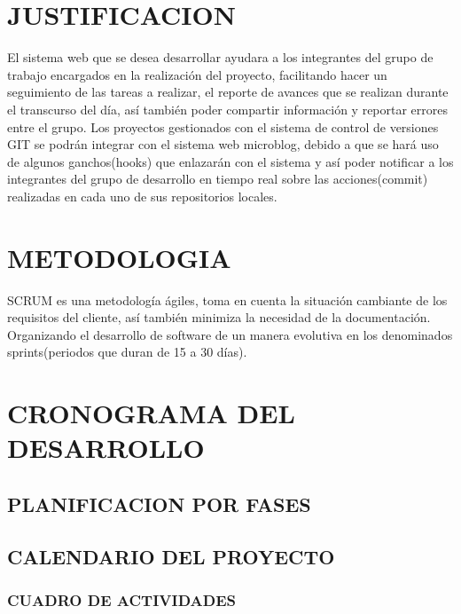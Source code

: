 \section{JUSTIFICACION}
El sistema web que se desea desarrollar ayudara  a los integrantes del grupo de trabajo encargados en la realización del proyecto, facilitando hacer un seguimiento de las tareas a realizar, el reporte de avances que se realizan durante el transcurso del día, así también poder compartir información y reportar errores entre el grupo.
Los proyectos gestionados con el sistema de control de versiones GIT se podrán integrar con el sistema web microblog, debido a que se hará uso de algunos ganchos(hooks) que enlazarán con el sistema y así poder notificar a los integrantes del grupo de desarrollo en tiempo real sobre las acciones(commit) realizadas en cada uno de sus repositorios locales.
\section{METODOLOGIA}
SCRUM es una metodología ágiles, toma en cuenta la situación cambiante de los requisitos del cliente, así también minimiza la necesidad de la documentación.
Organizando el desarrollo de software de un manera evolutiva en los denominados sprints(periodos que duran de 15 a 30 días).

\section{CRONOGRAMA DEL DESARROLLO}
\subsection{PLANIFICACION POR FASES}
\subsection{CALENDARIO DEL PROYECTO}
\subsubsection{CUADRO DE ACTIVIDADES}

%
